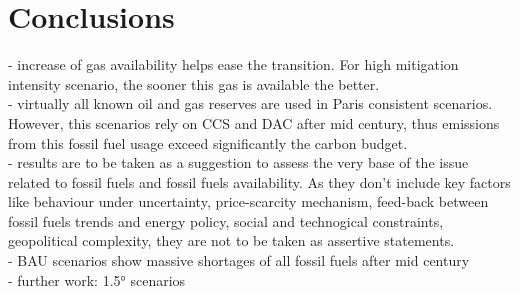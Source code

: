 \documentclass[11pt]{article} %
\begin{document}
\section{Conclusions}

- increase of gas availability helps ease the transition. For high mitigation intensity scenario, the sooner this gas is available the better. \\
- virtually all known oil and gas reserves are used in Paris consistent scenarios. However, this scenarios rely on CCS and DAC after mid century, thus emissions from this fossil fuel usage exceed significantly the carbon  budget. \\
- results are to be taken as a suggestion to assess the very base of the issue related to fossil fuels and fossil fuels availability. As they don't include key factors like behaviour under uncertainty, price-scarcity mechanism, feed-back between fossil fuels trends and energy policy, social and technogical constraints, geopolitical complexity, they are not to be taken as assertive statements. \\
- BAU scenarios show massive shortages of all fossil fuels after mid century \\
- further work: 1.5° scenarios  
\end{document}
